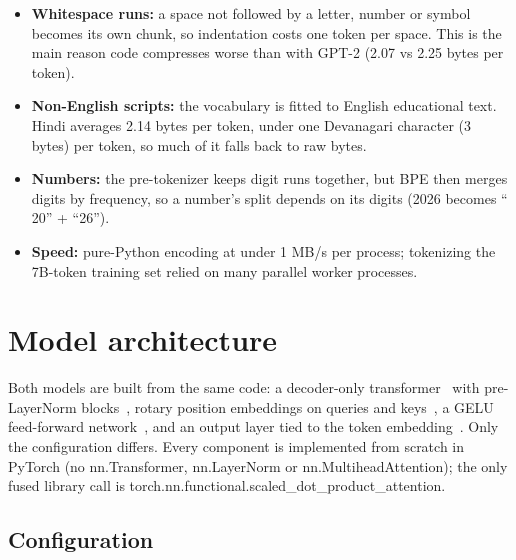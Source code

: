 \documentclass[11pt]{article}
\begin{document}
\begin{itemize}
\item \textbf{Whitespace runs:} a space not followed by a letter, number or symbol becomes its own chunk, so indentation costs one token per space. This is the main reason code compresses worse than with GPT-2 (2.07 vs 2.25 bytes per token).
\item \textbf{Non-English scripts:} the vocabulary is fitted to English educational text. Hindi averages 2.14 bytes per token, under one Devanagari character (3 bytes) per token, so much of it falls back to raw bytes.
\item \textbf{Numbers:} the pre-tokenizer keeps digit runs together, but BPE then merges digits by frequency, so a number's split depends on its digits (2026 becomes `` 20'' + ``26'').
\item \textbf{Speed:} pure-Python encoding at under 1 MB/\allowbreak{}s per process; tokenizing the 7B-token training set relied on many parallel worker processes.
\end{itemize}

\section{Model architecture}

Both models are built from the same code: a decoder-only transformer~\citep{vaswani2017attention,radford2019gpt2} with pre-LayerNorm blocks~\citep{ba2016layernorm,xiong2020preln}, rotary position embeddings on queries and keys~\citep{su2021roformer}, a GELU feed-forward network~\citep{hendrycks2016gelu}, and an output layer tied to the token embedding~\citep{press2017tying}. Only the configuration differs. Every component is implemented from scratch in PyTorch (no nn.Transformer, nn.LayerNorm or nn.MultiheadAttention); the only fused library call is torch.nn.functional.scaled\_\allowbreak{}dot\_\allowbreak{}product\_\allowbreak{}attention.

\subsection{Configuration}
\end{document}
